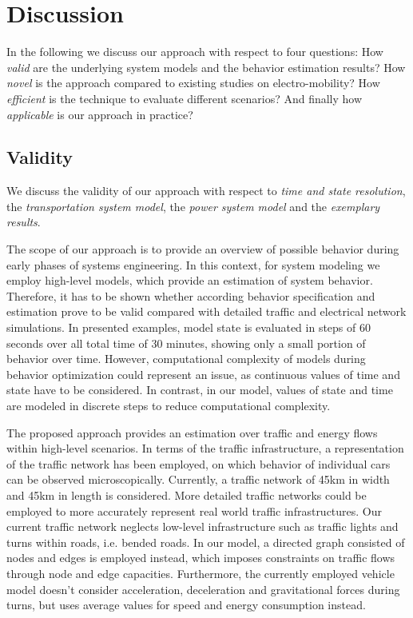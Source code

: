 \section{Discussion}
\label{section:discussion}

In the following we discuss our approach with respect to four questions: How \textit{valid} are the underlying system models and the behavior estimation results? How \textit{novel} is the approach compared to existing studies on electro-mobility? How \textit{efficient} is the technique to evaluate different scenarios? And finally how \textit{applicable} is our approach in practice?

\subsection{Validity}

We discuss the validity of our approach with respect to \textit{time and state resolution}, the \textit{transportation system model}, the \textit{power system model} and the \textit{exemplary results}.

The scope of our approach is to provide an overview of possible behavior during early phases of systems engineering. In this context, for system modeling we employ high-level models, which provide an estimation of system behavior. Therefore, it has to be shown whether according behavior specification and estimation prove to be valid compared with detailed traffic and electrical network simulations. In presented examples, model state is evaluated in steps of 60 seconds over all total time of 30 minutes, showing only a small portion of behavior over time. However, computational complexity of models during behavior optimization could represent an issue, as continuous values of time and state have to be considered. In contrast, in our model, values of state and time are modeled in discrete steps to reduce computational complexity.

The proposed approach provides an estimation over traffic and energy flows within high-level scenarios. In terms of the traffic infrastructure, a representation of the traffic network has been employed, on which behavior of individual cars can be observed microscopically. Currently, a traffic network of 45km in width and 45km in length is considered. More detailed traffic networks could be employed to more accurately represent real world traffic infrastructures. Our current traffic network neglects low-level infrastructure such as traffic lights and turns within roads, i.e. bended roads. In our model, a directed graph consisted of nodes and edges is employed instead, which imposes constraints on traffic flows through node and edge capacities. Furthermore, the currently employed vehicle model doesn't consider acceleration, deceleration and gravitational forces during turns, but uses average values for speed and energy consumption instead.

